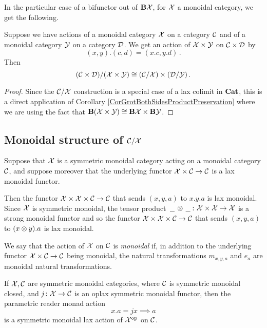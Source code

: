 \documentclass{article}
\begin{document}
In the particular case of a bifunctor out of $\mathbf B\mathcal X$, for $\mathcal X$ a monoidal category, we get the following.

\begin{corollary}
  Suppose we have actions of a monoidal category $\mathcal X$ on a category ${\mathcal{C}}$ and of a monoidal category $\mathcal Y$ on a category ${\mathcal{D}}$.
  We get an action of $\mathcal X\times\mathcal Y$ on ${\mathcal{C}}\times {\mathcal{D}}$ by
  \[
    (x,y).(c,d) = (x.c,y.d)\,.
    \]
  Then
  \[
    ({\mathcal{C}}\times{\mathcal{D}})/(\mathcal X\times\mathcal Y)\cong ({\mathcal{C}}/\mathcal X) \times ({\mathcal{D}}/\mathcal Y)\,.
    \]
  \label{CorQuotProductPreservation}
\end{corollary}
\begin{proof}
  Since the ${\mathcal{C}}/\mathcal X$ construction is a special case of a lax colimit in ${\normalfont\textbf{Cat}}$, this is a direct application of Corollary \ref{CorGrotBothSidesProductPreservation} where we are using the fact that $\mathbf B(\mathcal X\times\mathcal Y)\cong \mathbf B\mathcal X \times \mathbf B\mathcal Y$.
\end{proof}

\subsection{Monoidal structure of ${\mathcal{C}}/\mathcal X$}

\begin{definition}
  Suppose that $\mathcal X$ is a symmetric monoidal category acting on a monoidal category ${\mathcal{C}}$, and suppose moreover that the underlying functor $\mathcal X\times{\mathcal{C}} \to {\mathcal{C}}$ is a lax monoidal functor.  
  
  Then the functor $\mathcal X\times\mathcal X\times{\mathcal{C}}\to {\mathcal{C}}$ that sends $(x,y,a)$ to $x.y.a$ is lax monoidal.  
  Since $\mathcal X$ is symmetric monoidal, the tensor product $\,\underline{\hspace{1.5ex}}\,\otimes\,\underline{\hspace{1.5ex}}\,\colon \mathcal X \times\mathcal X \to \mathcal X$ is a strong monoidal functor and so the functor $\mathcal X \times \mathcal X \times {\mathcal{C}} \to {\mathcal{C}}$ that sends $(x,y,a)$ to $(x\otimes y).a$ is lax monoidal.

  We say that the action of $\mathcal X$ on ${\mathcal{C}}$ is \emph{monoidal} if, in addition to the underlying functor $\mathcal X \times {\mathcal{C}} \to {\mathcal{C}}$ being monoidal, the natural transformations $m_{x,y,a}$ and $e_a$ are monoidal natural transformations.
  \label{DefMonoidalLaxAction}
\end{definition}

\begin{example}
  If $\mathcal X,{\mathcal{C}}$ are symmetric monoidal categories, where ${\mathcal{C}}$ is symmetric monoidal closed, and $j\colon \mathcal X \to {\mathcal{C}}$ is an oplax symmetric monoidal functor, then the parametric reader monad action
  \[
    x.a = jx\implies a
    \]
  is a symmetric monoidal lax action of $\mathcal X^{\mathrm{op}}$ on ${\mathcal{C}}$.
\end{example}
\end{document}
